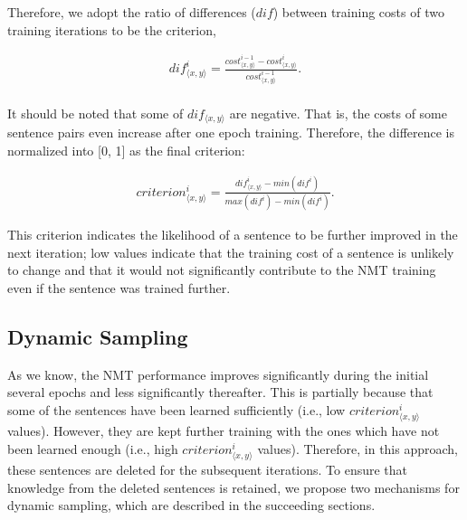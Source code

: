\documentclass[11pt,a4paper]{article}
\begin{document}
Therefore, we adopt the ratio of differences ($dif$) between training costs of two training iterations to be the criterion,


	\begin{equation}
		\label{eq:cost-diff}
		\begin{aligned}
			dif_{{\langle x, y\rangle}}^i= \frac{cost_{{\langle x, y\rangle}}^{i-1} - cost_{{\langle x, y\rangle}}^i} {cost_{{\langle x, y\rangle}}^{i-1}}. \\
		\end{aligned}
	\end{equation}

It should be noted that some of $dif_{{\langle x, y\rangle}}$ are negative. That is, the costs of some sentence pairs even increase after one epoch training. Therefore, the difference is normalized into [0, 1] as the final criterion: 

\begin{equation}
	\label{eq:cost-diff-norm}
	\begin{aligned}
		criterion_{{\langle x, y\rangle}}^i = \frac{dif_{{\langle x, y\rangle}}^i - min(dif^i)} {max(dif^i) - min(dif^i)}.
	\end{aligned}
\end{equation}


This criterion indicates the likelihood of a sentence to be further improved in the next iteration; low values indicate that the training cost of a sentence is unlikely to change and that it would not significantly contribute to the NMT training even if the sentence was trained further.



\subsection{Dynamic Sampling}
\label{sec:ds}
As we know, the NMT performance improves significantly during the initial several epochs and less significantly thereafter. This is partially because that some of the sentences have been learned sufficiently (i.e., low  $criterion_{{\langle x, y\rangle}}^i$ values). However, they are kept further training with the ones which have not been learned enough (i.e., high  $criterion_{{\langle x, y\rangle}}^i$ values). Therefore, in this approach, these sentences are deleted for the subsequent iterations. To ensure that knowledge from the deleted sentences is retained, we propose two mechanisms for dynamic sampling, which are described in the succeeding sections.
\end{document}
